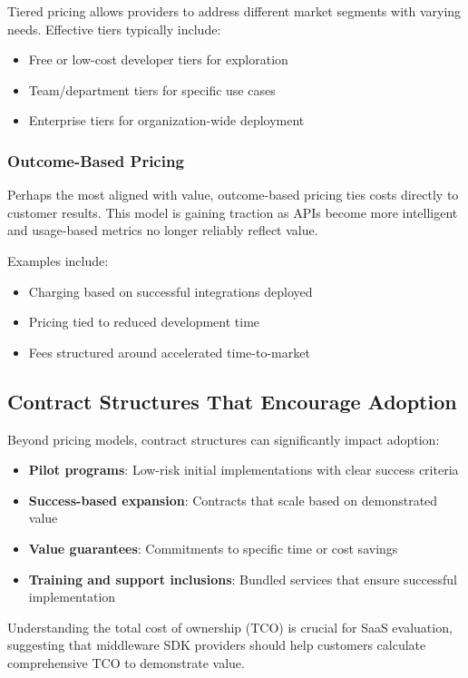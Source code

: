 \documentclass[11pt,a4paper]{article}
\begin{document}
Tiered pricing allows providers to address different market segments with varying needs. Effective tiers typically include:
\begin{itemize}
    \item Free or low-cost developer tiers for exploration
    \item Team/department tiers for specific use cases
    \item Enterprise tiers for organization-wide deployment
\end{itemize}

\subsubsection{Outcome-Based Pricing}

Perhaps the most aligned with value, outcome-based pricing ties costs directly to customer results. This model is gaining traction as APIs become more intelligent and usage-based metrics no longer reliably reflect value.

Examples include:
\begin{itemize}
    \item Charging based on successful integrations deployed
    \item Pricing tied to reduced development time
    \item Fees structured around accelerated time-to-market
\end{itemize}

\subsection{Contract Structures That Encourage Adoption}

Beyond pricing models, contract structures can significantly impact adoption:

\begin{itemize}
    \item \textbf{Pilot programs}: Low-risk initial implementations with clear success criteria
    \item \textbf{Success-based expansion}: Contracts that scale based on demonstrated value
    \item \textbf{Value guarantees}: Commitments to specific time or cost savings
    \item \textbf{Training and support inclusions}: Bundled services that ensure successful implementation
\end{itemize}

Understanding the total cost of ownership (TCO) is crucial for SaaS evaluation, suggesting that middleware SDK providers should help customers calculate comprehensive TCO to demonstrate value.
\end{document}
